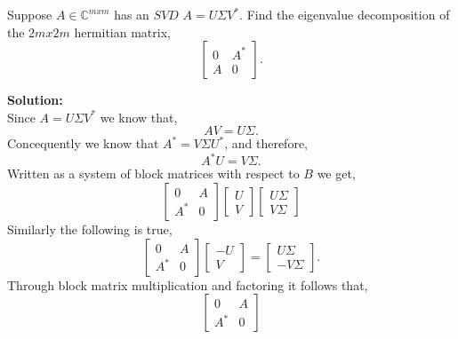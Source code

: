 \documentclass[12pt]{article}
\makeatletter
\theoremstyle{homework}
\newenvironment{exercise}[1]
{\def\@currentlabel{#1}\exercisecore}
{\endexercisecore}
\newcommand{\localhead}[1]{\par\smallskip\noindent\textbf{#1}\nobreak\\}%
\newcommand\solution{\localhead{Solution:}}
\newcommand{\Cplx}{\ensuremath{\mathbb C}}
\let\CC\Cplx
\makeatother
\begin{document}
\begin{exercise}{5.4} Suppose $A \in \CC^{mxm}$ has an $SVD$ $A = U\Sigma V^*$. Find the eigenvalue decomposition of the 
  $2mx2m$ hermitian matrix,
  \begin{equation*}
    \begin{bmatrix}
      0 & A^*\\
      A & 0
    \end{bmatrix}.
  \end{equation*}
  \solution Since $A = U\Sigma V^*$ we know that, 
  \begin{equation*}
    AV = U\Sigma.
  \end{equation*}
  Concequently we know that $A^* = V \Sigma U^*$, and therefore,
  \begin{equation*}
    A^*U = V\Sigma. 
  \end{equation*}
  Written as a system of block matrices with respect to $B$ we get, 
  \begin{equation*}
    \begin{bmatrix}
      0 & A\\
      A^* & 0
    \end{bmatrix}
    \begin{bmatrix}
      U\\
      V
    \end{bmatrix}
    \begin{bmatrix}
      U\Sigma\\
      V\Sigma
    \end{bmatrix}
  \end{equation*}
  Similarly the following is true, 
  \begin{equation*}
    \begin{bmatrix}
      0 & A\\
      A^* & 0
    \end{bmatrix}
    \begin{bmatrix}
      -U\\
      V
    \end{bmatrix}
     = 
    \begin{bmatrix}
      U\Sigma\\
      -V\Sigma
    \end{bmatrix}.
  \end{equation*}
  Through block matrix multiplication  and factoring it follows that, 
  \begin{equation*}
    \begin{bmatrix}
      0 & A\\
      A^* & 0
    \end{bmatrix}

\end{equation*}
\end{exercise}
\end{document}
